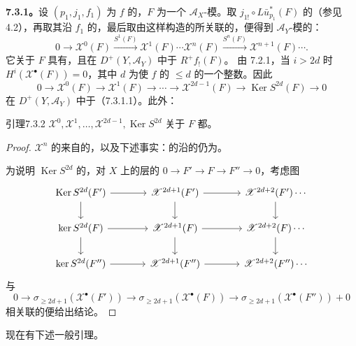 \textbf{7.3.1。}设 $(p_1,j_1,f_1)$ 为 $f$ 的，$F$ 为一个 $\mathscr A_X$-模。取 $j_{1!}\circ L\bar u_{p_1}^*(F)$ 的（参见 4.2），再取其沿 $f_1$ 的，最后取由这样构造的所关联的，便得到 $\mathscr A_Y$-模的：
\begin{equation}\tag{7.3.1.1}
0\longrightarrow\mathscr X^0(F)\xrightarrow{S^1(F)}\mathscr X^1(F)\cdots
\mathscr X^n(F)\xrightarrow{S^n(F)}\mathscr X^{n+1}(F)\cdots.
\end{equation}
它关于 $F$ 具有，且在 $D^+(Y,\mathscr A_Y)$ 中于 $R^+f_!(F)$。
由 7.2.1，当 $i>2d$ 时 $H^i(\mathscr X^\bullet(F))=0$，其中 $d$ 为使 $f$ 的 $\le d$ 的一个整数。因此
\begin{equation}\tag{7.3.1.2}
0\longrightarrow\mathscr X^0(F)\longrightarrow\mathscr X^1(F)\longrightarrow\cdots
\longrightarrow\mathscr X^{2d-1}(F)\longrightarrow\operatorname{Ker}S^{2d}(F)\longrightarrow0
\end{equation}
在 $D^+(Y,\mathscr A_Y)$ 中于（7.3.1.1）。此外：

\begin{SGAresult}{引理}{7.3.2}
 $\mathscr X^0,\mathscr X^1,\ldots,\mathscr X^{2d-1},\operatorname{Ker}S^{2d}$ 关于 $F$ 都。
\end{SGAresult}
\begin{proof}
 $\mathscr X^n$ 的来自的，以及下述事实：的沿的仍为。

为说明 $\operatorname{Ker}S^{2d}$ 的，对 $X$ 上的层的 $0\to F'\to F\to F''\to0$，考虑图
\[
\begin{tikzcd}[column sep=large]
\operatorname{Ker}S^{2d}(F')\arrow[r]\arrow[d]&\mathscr X^{2d+1}(F')\arrow[r]\arrow[d]&\mathscr X^{2d+2}(F')\cdots\arrow[d]\\
\operatorname{ker}S^{2d}(F)\arrow[r]\arrow[d]&\mathscr X^{2d+1}(F)\arrow[r]\arrow[d]&\mathscr X^{2d+2}(F)\cdots\arrow[d]\\
\operatorname{ker}S^{2d}(F'')\arrow[r]&\mathscr X^{2d+1}(F'')\arrow[r]&\mathscr X^{2d+2}(F'')\cdots
\end{tikzcd}
\]
与
\[0\longrightarrow\sigma_{\ge2d+1}(\mathscr X^\bullet(F'))\longrightarrow\sigma_{\ge2d+1}(\mathscr X^\bullet(F))
\longrightarrow\sigma_{\ge2d+1}(\mathscr X^\bullet(F''))+0\]
相关联的便给出结论。
\end{proof}
现在有下述一般引理。

